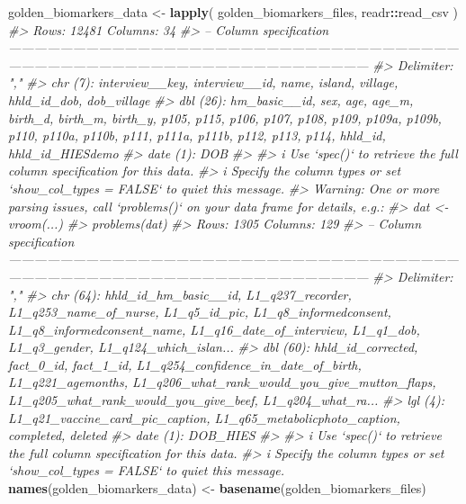\documentclass[]{article}
\newenvironment{Shaded}{\begin{snugshade}}{\end{snugshade}}
\newcommand{\CommentTok}[1]{\textcolor[rgb]{0.56,0.35,0.01}{\textit{#1}}}
\newcommand{\KeywordTok}[1]{\textcolor[rgb]{0.13,0.29,0.53}{\textbf{#1}}}
\newcommand{\NormalTok}[1]{#1}
\newcommand{\OperatorTok}[1]{\textcolor[rgb]{0.81,0.36,0.00}{\textbf{#1}}}
\newcommand{\StringTok}[1]{\textcolor[rgb]{0.31,0.60,0.02}{#1}}
\begin{document}
\begin{Shaded}
\begin{Highlighting}[]
\NormalTok{golden_biomarkers_data <-}\StringTok{ }\KeywordTok{lapply}\NormalTok{(}
\NormalTok{  golden_biomarkers_files,}
\NormalTok{  readr}\OperatorTok{::}\NormalTok{read_csv}
\NormalTok{)}
\CommentTok{#> Rows: 12481 Columns: 34}
\CommentTok{#> -- Column specification ---------------------------------------------------------------------------------------------------------------------------------------------------------------------------------------------}
\CommentTok{#> Delimiter: ","}
\CommentTok{#> chr   (7): interview__key, interview__id, name, island, village, hhld_id_dob, dob_village}
\CommentTok{#> dbl  (26): hm_basic__id, sex, age, age_m, birth_d, birth_m, birth_y, p105, p115, p106, p107, p108, p109, p109a, p109b, p110, p110a, p110b, p111, p111a, p111b, p112, p113, p114, hhld_id, hhld_id_HIESdemo}
\CommentTok{#> date  (1): DOB}
\CommentTok{#> }
\CommentTok{#> i Use `spec()` to retrieve the full column specification for this data.}
\CommentTok{#> i Specify the column types or set `show_col_types = FALSE` to quiet this message.}
\CommentTok{#> Warning: One or more parsing issues, call `problems()` on your data frame for details, e.g.:}
\CommentTok{#>   dat <- vroom(...)}
\CommentTok{#>   problems(dat)}
\CommentTok{#> Rows: 1305 Columns: 129}
\CommentTok{#> -- Column specification ---------------------------------------------------------------------------------------------------------------------------------------------------------------------------------------------}
\CommentTok{#> Delimiter: ","}
\CommentTok{#> chr  (64): hhld_id_hm_basic__id, L1_q237_recorder, L1_q253_name_of_nurse, L1_q5_id_pic, L1_q8_informedconsent, L1_q8_informedconsent_name, L1_q16_date_of_interview, L1_q1_dob, L1_q3_gender, L1_q124_which_islan...}
\CommentTok{#> dbl  (60): hhld_id_corrected, fact_0_id, fact_1_id, L1_q254_confidence_in_date_of_birth, L1_q221_agemonths, L1_q206_what_rank_would_you_give_mutton_flaps, L1_q205_what_rank_would_you_give_beef, L1_q204_what_ra...}
\CommentTok{#> lgl   (4): L1_q21_vaccine_card_pic_caption, L1_q65_metabolicphoto_caption, completed, deleted}
\CommentTok{#> date  (1): DOB_HIES}
\CommentTok{#> }
\CommentTok{#> i Use `spec()` to retrieve the full column specification for this data.}
\CommentTok{#> i Specify the column types or set `show_col_types = FALSE` to quiet this message.}
\KeywordTok{names}\NormalTok{(golden_biomarkers_data) <-}\StringTok{ }\KeywordTok{basename}\NormalTok{(golden_biomarkers_files)}
\end{Highlighting}
\end{Shaded}
\end{document}
